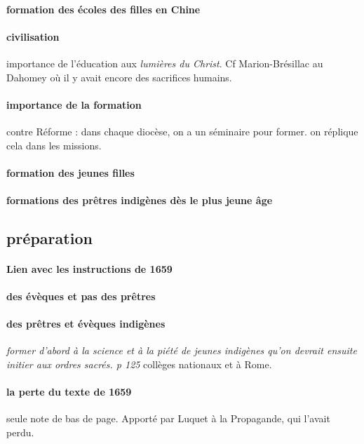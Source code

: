 \paragraph{formation des écoles des filles en Chine}

\paragraph{civilisation} importance de l'éducation aux \textit{lumières du Christ}. Cf Marion-Brésillac au Dahomey où il y avait encore des sacrifices humains. 

\paragraph{importance de la formation} contre Réforme : dans chaque diocèse, on a un séminaire pour former. on réplique cela dans les missions.


\paragraph{formation des jeunes filles}

\paragraph{formations des prêtres indigènes dès le plus jeune âge}


\subsection{préparation}
\paragraph{Lien avec les instructions de 1659}




\paragraph{des évèques et pas des prêtres}

\paragraph{des prêtres et évèques indigènes} \textit{former d'abord à la science et à la piété de jeunes indigènes qu'on devrait ensuite initier aux ordres sacrés. p 125} collèges nationaux et à Rome. 

\paragraph{la perte du texte de 1659} seule note de bas de page. Apporté par Luquet à la Propagande, qui l'avait perdu.

